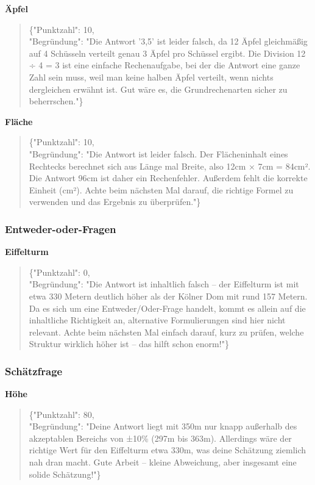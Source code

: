 \documentclass[a4paper,12pt]{article}
\begin{document}
\textbf{Äpfel}
\begin{quote}
\{"Punktzahl": 10,\\
"Begründung": "Die Antwort '3,5' ist leider falsch, da 12 Äpfel gleichmäßig auf 4 Schüsseln verteilt genau 3 Äpfel pro Schüssel ergibt. Die Division 12 ÷ 4 = 3 ist eine einfache Rechenaufgabe, bei der die Antwort eine ganze Zahl sein muss, weil man keine halben Äpfel verteilt, wenn nichts dergleichen erwähnt ist. Gut wäre es, die Grundrechenarten sicher zu beherrschen."\}
\end{quote}

\textbf{Fläche}
\begin{quote}
\{"Punktzahl": 10,\\
"Begründung": "Die Antwort ist leider falsch. Der Flächeninhalt eines Rechtecks berechnet sich aus Länge mal Breite, also 12cm × 7cm = 84cm². Die Antwort 96cm ist daher ein Rechenfehler. Außerdem fehlt die korrekte Einheit (cm²). Achte beim nächsten Mal darauf, die richtige Formel zu verwenden und das Ergebnis zu überprüfen."\}
\end{quote}

\subsubsection{Entweder-oder-Fragen}

\textbf{Eiffelturm}
\begin{quote}
\{"Punktzahl": 0,\\
"Begründung": "Die Antwort ist inhaltlich falsch – der Eiffelturm ist mit etwa 330 Metern deutlich höher als der Kölner Dom mit rund 157 Metern. Da es sich um eine Entweder/Oder-Frage handelt, kommt es allein auf die inhaltliche Richtigkeit an, alternative Formulierungen sind hier nicht relevant. Achte beim nächsten Mal einfach darauf, kurz zu prüfen, welche Struktur wirklich höher ist – das hilft schon enorm!"\}
\end{quote}

\subsubsection{Schätzfrage}

\textbf{Höhe}
\begin{quote}
\{"Punktzahl": 80,\\
"Begründung": "Deine Antwort liegt mit 350m nur knapp außerhalb des akzeptablen Bereichs von ±10\% (297m bis 363m). Allerdings wäre der richtige Wert für den Eiffelturm etwa 330m, was deine Schätzung ziemlich nah dran macht. Gute Arbeit – kleine Abweichung, aber insgesamt eine solide Schätzung!"\}
\end{quote}
\end{document}
